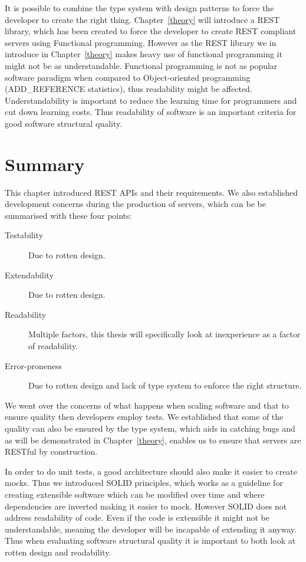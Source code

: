 It is possible to combine the type system with design patterns to force the
developer to create the right thing. Chapter~\ref{theory} will introduce a REST
library, which has been created to force the developer to create REST compliant
servers using Functional programming. However as the REST library we in
introduce in Chapter~\ref{theory} makes heavy use of functional programming it
might not be as understandable.  Functional programming is not as popular
software paradigm when compared to Object-oriented programming (ADD\_REFERENCE
statistics), thus readability might be affected.  Understandability is important
to reduce the learning time for programmers and cut down learning costs. Thus
readability of software is an important criteria for good software structural
quality.

\section{Summary}\label{backgroundconclusion}

This chapter introduced REST APIs and their requirements.  We also established
development concerns during the production of servers, which can be be
summarised with these four points:

\begin{description}
    \item[Testability] Due to rotten design.
    \item[Extendability] Due to rotten design.
    \item[Readability] Multiple factors, this thesis will specifically look at 
		inexperience as a factor of readability.
    \item[Error-proneness] Due to rotten design and lack of type system to
        enforce the right structure.
\end{description}

We went over the concerns of what happens when scaling software and that to
ensure quality then developers employ tests. We established that some of the
quality can also be ensured by the type system, which aids in catching bugs and
as will be demonstrated in Chapter~\ref{theory}, enables us to ensure that
servers are RESTful by construction. 

In order to do unit tests, a good architecture should also make it easier to
create mocks. Thus we introduced SOLID principles, which works as a guideline
for creating extensible software which can be modified over time and where
dependencies are inverted making it easier to mock. However SOLID does not
address readability of code. Even if the code is extensible it might not be
understandable, meaning the developer will be incapable of extending it anyway.
Thus when evaluating software structural quality it is important to both look at
rotten design and readability.
